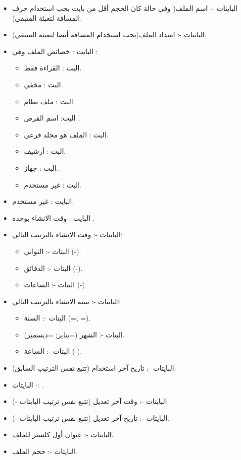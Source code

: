 \documentclass[document.tex]{subfiles}
\begin{document}
\begin{itemize}

\item البايتات -: اسم الملف( وفي حالة كان الحجم أقل من  بايت يجب استخدام حرف المسافة لتعبئة المتبقي).
\item البايتات -: امتداد الملف(يجب استخدام المسافة أيضا لتعبئة المتبقي).
\item البايت : خصائص الملف وهي :
\begin{itemize}
\item البت : القراءة فقط.
\item البت : مخفي.
\item البت : ملف نظام.
\item البت: اسم القرص .
\item البت : الملف هو مجلد فرعي.
\item البت : أرشيف.
\item البت : جهاز.
\item البت : غير مستخدم.
\end{itemize}

\item البايت : غير مستخدم.
\item البايت : وقت الانشاء بوحدة .
\item البايتات -: وقت الانشاء بالترتيب التالي:

\begin{itemize}
\item البتات -: الثواني (-).
\item البتات -: الدقائق (-).
\item البتات -: الساعات (-).
\end{itemize}

\item البايتات -: سنة الانشاء بالترتيب التالي:

\begin{itemize}
\item البتات -: السنة (=; =).
\item البتات -: الشهر (=يناير; =ديسمبر).
\item البتات -: الساعة (-).
\end{itemize}

\item البايتات -: تاريخ آخر استخدام (تتبع نفس الترتيب السابق).
\item البايتات -: .
\item البايتات -: وقت آخر تعديل (تتبع نفس ترتيب البايتات -).
\item البايتات -: تاريخ آخر تعديل (تتبع نفس ترتيب البايتات -).
\item البايتات -: عنوان أول كلستر للملف.
\item البايتات -: حجم الملف.


\end{itemize}
\end{document}
